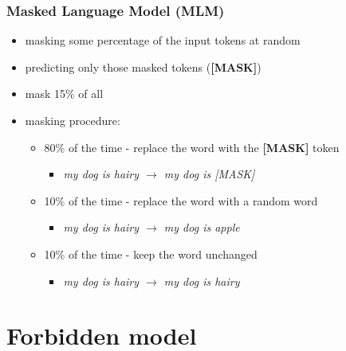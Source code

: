 \documentclass{beamer}
\begin{document}
\begin{frame}
    \frametitle{Masked Language Model (MLM)}
    \begin{itemize}
        \item masking some percentage of the input tokens at random
        \item predicting only those masked tokens (\textbf{[MASK]})
        \item mask 15\% of all
        \item masking procedure:
        \begin{itemize}
        	\item 80\% of the time - replace the word with the \textbf{[MASK]} token
        	\begin{itemize}
        		\item \textit{my dog is hairy $\rightarrow$ my dog is [MASK]}
        	\end{itemize}
        	\item 10\% of the time - replace the word with a random word
        	\begin{itemize}
        		\item \textit{my dog is hairy $\rightarrow$ my dog is apple}
        	\end{itemize}
        	\item 10\% of the time - keep the word  unchanged
        	\begin{itemize}
        		\item \textit{my dog is hairy $\rightarrow$ my dog is hairy}
        	\end{itemize}
        \end{itemize}
    \end{itemize}
\end{frame}


\section{Forbidden model}
\end{document}

